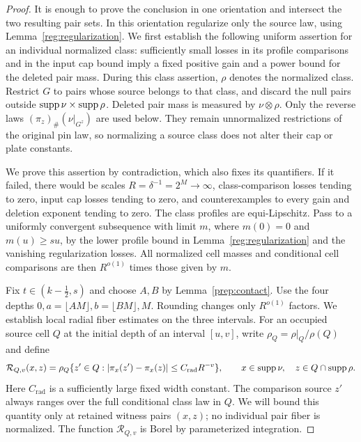 \begin{proof}
It is enough to prove the conclusion in one orientation and intersect the
two resulting pair sets. In this orientation regularize only the source
law, using Lemma~\ref{reg:regularization}. We first establish the
following uniform assertion for an individual normalized class: sufficiently
small losses in its profile comparisons and in the input cap bound imply
a fixed positive gain and a power bound for the deleted pair mass.
During this class assertion, $\rho$ denotes the normalized class.
Restrict $G$ to pairs whose source belongs to that class, and discard
the null pairs outside $\operatorname{supp}\nu\times\operatorname{supp}\rho$. Deleted pair mass
is measured by $\nu\otimes\rho$.
Only the reverse laws $(\pi_z)_\#(\nu|_{G^z})$ are used below.
They remain unnormalized restrictions of the original pin law, so
normalizing a source class does not alter their cap or plate constants.

We prove this assertion by contradiction, which also fixes its quantifiers.
If it failed, there would be scales $R=\delta^{-1}=2^M\to\infty$,
class-comparison losses tending to zero, input cap losses tending to zero,
and counterexamples to every gain and deletion exponent tending to zero.
The class profiles are equi-Lipschitz. Pass to a uniformly convergent
subsequence with limit $m$, where $m(0)=0$ and $m(u)\ge su$,
by the lower profile bound in Lemma~\ref{reg:regularization} and
the vanishing regularization losses. All normalized cell masses and conditional cell comparisons are
then $R^{o(1)}$ times those given by $m$.

Fix $t\in(k-\tfrac12,s)$ and choose $A,B$ by
Lemma~\ref{prep:contact}. Use the four depths
$0,a=\lfloor AM\rfloor,b=\lfloor BM\rfloor,M$.
Rounding changes only $R^{o(1)}$ factors. We establish local radial
fiber estimates on the three intervals. For an occupied source cell $Q$ at
the initial depth of an interval $[u,v]$, write
$\rho_Q=\rho|_Q/\rho(Q)$ and define
\[
 \mathcal R_{Q,v}(x,z)
 =\rho_Q\{z'\in Q:
       |\pi_x(z')-\pi_x(z)|\le C_{\mathrm{rad}}R^{-v}\},
 \qquad x\in\operatorname{supp}\nu,\quad z\in Q\cap\operatorname{supp}\rho.
\]
Here $C_{\mathrm{rad}}$ is a sufficiently large fixed width constant.
The comparison source $z'$ always ranges over the full conditional
class law in $Q$. We will bound this quantity only at retained witness
pairs $(x,z)$; no individual pair fiber is normalized. The function
$\mathcal R_{Q,v}$ is Borel by parameterized integration.


\end{proof}
